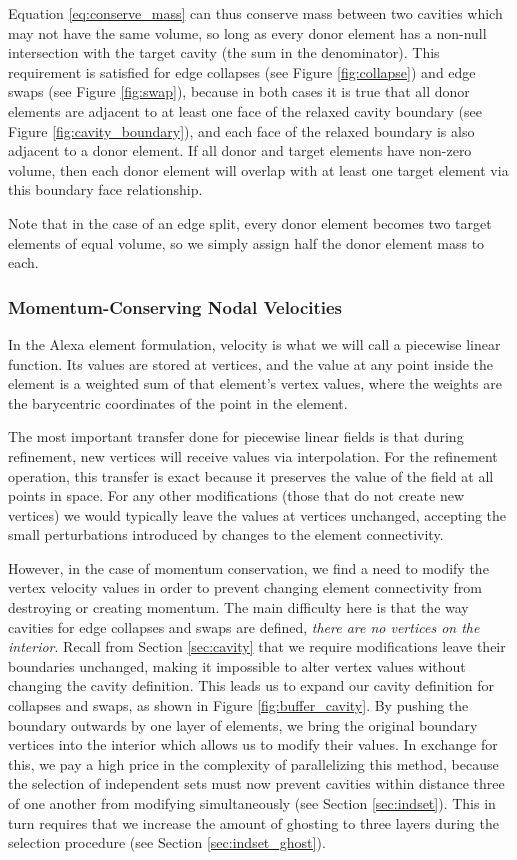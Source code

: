 Equation \ref{eq:conserve_mass} can thus conserve mass between
two cavities which may not have the same volume, so long as every
donor element has a non-null intersection with the target cavity
(the sum in the denominator).
This requirement is satisfied for edge collapses (see Figure
\ref{fig:collapse}) and edge swaps (see Figure \ref{fig:swap}),
because in both cases it is true that
all donor elements are adjacent to at least one face of
the relaxed cavity boundary (see Figure \ref{fig:cavity_boundary}),
and each face of the relaxed boundary is also adjacent to
a donor element.
If all donor and target elements have non-zero volume, then
each donor element will overlap with at least one target element
via this boundary face relationship.

Note that in the case of an edge split, every donor element
becomes two target elements of equal volume, so we simply
assign half the donor element mass to each.

\subsubsection{Momentum-Conserving Nodal Velocities}
\label{sec:conserve_momentum}

In the Alexa element formulation, velocity is what we will
call a piecewise linear function.
Its values are stored at vertices, and the value at any point
inside the element is a weighted sum of that element's vertex values,
where the weights are the barycentric coordinates of the point
in the element.

The most important transfer done for piecewise linear fields is that during
refinement, new vertices will receive values via interpolation.
For the refinement operation, this transfer is exact because
it preserves the value of the field at all points in space.
For any other modifications (those that do not create
new vertices) we would typically leave the values at vertices unchanged,
accepting the small perturbations introduced by changes
to the element connectivity.

However, in the case of momentum conservation, we find a need
to modify the vertex velocity values in order to prevent
changing element connectivity from destroying or creating momentum.
The main difficulty here is that the way cavities for edge
collapses and swaps are defined, \emph{there are no vertices on
the interior}.
Recall from Section \ref{sec:cavity} that we require modifications
leave their boundaries unchanged, making it impossible to alter
vertex values without changing the cavity definition.
This leads us to expand our cavity definition for collapses
and swaps, as shown in Figure \ref{fig:buffer_cavity}.
By pushing the boundary outwards by one layer of elements,
we bring the original boundary vertices into the interior
which allows us to modify their values.
In exchange for this, we pay a high price in the complexity
of parallelizing this method, because the selection of independent
sets must now prevent cavities within distance three of
one another from modifying simultaneously (see Section \ref{sec:indset}).
This in turn requires that we increase the amount of ghosting
to three layers during the selection procedure
(see Section \ref{sec:indset_ghost}).

